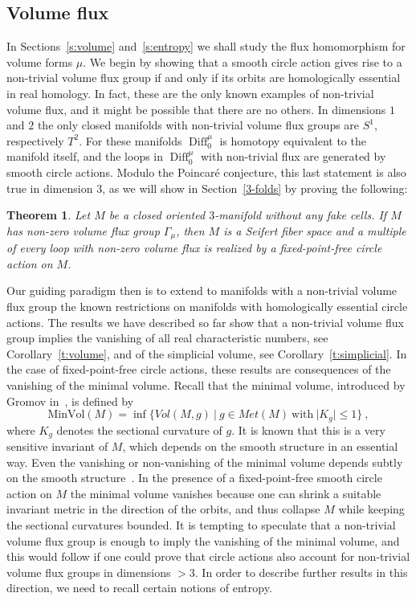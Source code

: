 \documentclass[12pt]{amsart}
\newtheorem{theorem}{Theorem}%
\theoremstyle{definition}
\theoremstyle{remark}
\newcommand\Diff{\operatorname{Diff}}
\begin{document}
\subsection{Volume flux}
In Sections~\ref{s:volume} and~\ref{s:entropy} we shall study the flux homomorphism for volume forms $\mu$.
We begin by showing that a smooth circle action gives rise to a non-trivial volume flux group if and only if
its orbits are homologically essential in real homology. In fact, these are the only known examples of non-trivial
volume flux, and it might be possible that there are no others. In dimensions $1$ and $2$
the only closed manifolds with non-trivial volume flux groups are $S^1$, respectively $T^2$. For these manifolds
$\Diff^{\mu}_0$ is homotopy equivalent to the manifold itself, and the loops in $\Diff^{\mu}_0$ with non-trivial
flux are generated by smooth circle actions. Modulo the Poincar\'e conjecture, this last statement is also true in 
dimension $3$, as we will show in Section~\ref{3-folds} by proving the following:
\begin{theorem}\label{t:SeifertA}
    Let $M$ be a closed oriented $3$-manifold without any fake cells.
    If $M$ has non-zero volume flux group $\Gamma_{\mu}$, then $M$ is a 
    Seifert fiber space and a multiple of every loop %
    with non-zero volume flux is realized by a fixed-point-free circle action on $M$. 
    \end{theorem}

Our guiding paradigm then is to extend to manifolds with a non-trivial volume flux group the known restrictions on 
manifolds with homologically essential circle actions. The results we have described so far show that a non-trivial
volume flux group implies the vanishing of all real characteristic numbers, see Corollary~\ref{t:volume}, and of the
simplicial volume, see Corollary~\ref{t:simplicial}. In the case of fixed-point-free circle actions, these  results are 
consequences of the vanishing of the minimal volume. Recall that the minimal volume, introduced by Gromov 
in~\cite{Gromov}, is defined by 
$$
\textrm{MinVol}(M)=\inf\{ Vol(M,g) \ \vert \ g\in Met(M) \ 
\textrm{with} \ \vert K_{g}\vert\leq 1 \} \ , 
$$
where $K_{g}$ denotes the sectional curvature of $g$. It is known that this is a very sensitive invariant of $M$, 
which depends on the smooth structure in an essential way. Even the vanishing or non-vanishing of the  minimal 
volume depends subtly on the smooth structure~\cite{entropies}. In the presence of a fixed-point-free smooth circle 
action on $M$ the minimal volume vanishes because one can shrink a suitable invariant metric in the direction of 
the orbits, and thus collapse $M$ while keeping the sectional curvatures bounded. It is tempting to speculate that a 
non-trivial volume flux group is enough to imply the vanishing of the minimal volume, and this would follow if one could
prove that circle actions also account for non-trivial volume flux groups in dimensions $>3$.
In order to describe further results in this direction, we need to recall certain notions of entropy.
\end{document}
